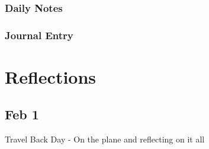 \documentclass[letterpaper]{report}
\begin{document}
\clearpage
\subsection{Daily Notes}

\clearpage
\subsection{Journal Entry}

\chapter{Reflections}
\section{Feb 1}
Travel Back Day - On the plane and reflecting on it all
\end{document}
